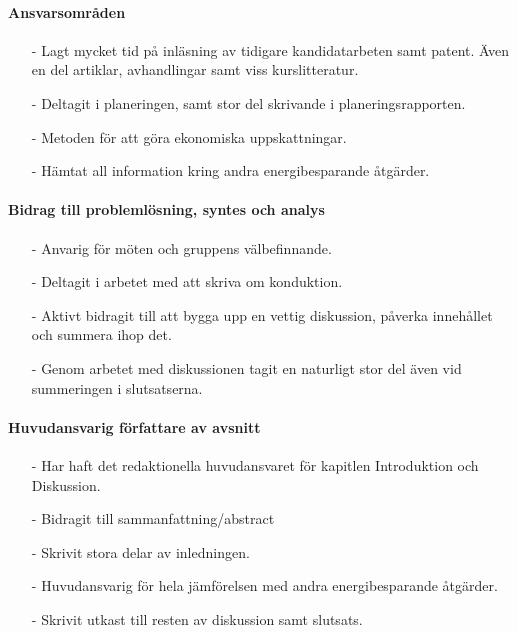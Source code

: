 \documentclass[12pt,a4paper]{article}
\begin{document}
\paragraph{Ansvarsområden}

\begin{itemize}
\item[-] Lagt mycket tid på inläsning av tidigare kandidatarbeten samt patent. Även en del artiklar, avhandlingar samt viss kurslitteratur. 
\item[-] Deltagit i planeringen, samt stor del skrivande i planeringsrapporten.
\item[-] Metoden för att göra ekonomiska uppskattningar.
\item[-] Hämtat all information kring andra energibesparande åtgärder. 
\end{itemize}


\paragraph{Bidrag till problemlösning, syntes och analys}

\begin{itemize}
\item[-] Anvarig för möten och gruppens välbefinnande.
\item[-] Deltagit i arbetet med att skriva om konduktion.
\item[-] Aktivt bidragit till att bygga upp en vettig diskussion, påverka innehållet och summera ihop det.
\item[-] Genom arbetet med diskussionen tagit en naturligt stor del även vid summeringen i slutsatserna.
\end{itemize}


\paragraph{Huvudansvarig författare av avsnitt}

\begin{itemize}
\item[-] Har haft det redaktionella huvudansvaret för kapitlen Introduktion och Diskussion.
\item[-] Bidragit till sammanfattning/abstract
\item[-] Skrivit stora delar av inledningen.
\item[-] Huvudansvarig för hela jämförelsen med andra energibesparande åtgärder.
\item[-] Skrivit utkast till resten av diskussion samt slutsats.
\end{itemize}
\end{document}
